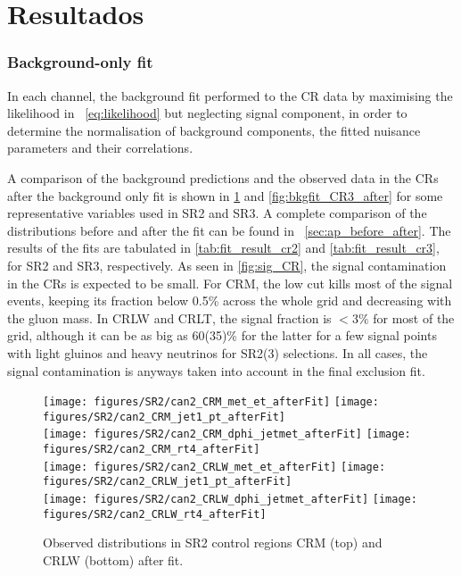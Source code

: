 \section{Resultados} \label{sec:results}

\subsubsection{Background-only fit} \label{sec:bkgonlyfit}

In each channel, the background fit performed to the CR data by maximising the likelihood in \Eq\ \ref{eq:likelihood} but neglecting signal component, in order to determine the normalisation of background components, the fitted nuisance parameters and their correlations.

A comparison of the background predictions and the observed data in the CRs after the background only fit is shown in \Fig \ref{fig:bkgfit_CR2_after} and \ref{fig:bkgfit_CR3_after} for some representative variables used in SR2 and SR3. A complete comparison of the distributions before and after the fit can be found in \App\ \ref{sec:ap_before_after}. The results of the fits are tabulated in \Tab \ref{tab:fit_result_cr2} and \ref{tab:fit_result_cr3}, for SR2 and SR3, respectively.
As seen in \Fig \ref{fig:sig_CR}, the signal contamination in the CRs is expected to be small. For CRM, the low \MET cut kills most of the signal events, keeping its fraction below 0.5\% across the whole grid and decreasing with the gluon mass. In CRLW and CRLT, the signal fraction is $<3\%$ for most of the grid, although it can be as big as 60(35)\% for the latter for a few signal points with light gluinos and heavy neutrinos for SR2(3) selections. In all cases, the signal contamination is anyways taken into account in the final exclusion fit.

\begin{figure}[ph!]
  \begin{center}
    \texttt{[image: figures/SR2/can2\_CRM\_met\_et\_afterFit]}
    \texttt{[image: figures/SR2/can2\_CRM\_jet1\_pt\_afterFit]} \\
    \texttt{[image: figures/SR2/can2\_CRM\_dphi\_jetmet\_afterFit]}
    \texttt{[image: figures/SR2/can2\_CRM\_rt4\_afterFit]} \\
    \texttt{[image: figures/SR2/can2\_CRLW\_met\_et\_afterFit]}
    \texttt{[image: figures/SR2/can2\_CRLW\_jet1\_pt\_afterFit]} \\
    \texttt{[image: figures/SR2/can2\_CRLW\_dphi\_jetmet\_afterFit]}
    \texttt{[image: figures/SR2/can2\_CRLW\_rt4\_afterFit]} \\
    \caption{Observed distributions in SR2 control regions CRM (top) and CRLW (bottom) after fit.}
    \label{fig:bkgfit_CR2_after}
  \end{center}
\end{figure}


